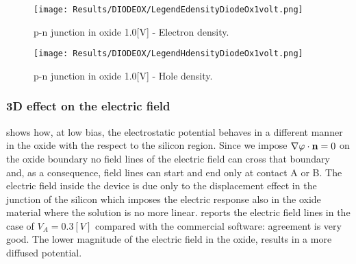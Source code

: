 \vspace{0.5cm}

\begin{figure}[!h]
\centering
{}
\hspace{0.1\textwidth}
\hspace{0.04\textwidth}
{\texttt{[image: Results/DIODEOX/LegendEdensityDiodeOx1volt.png]}}
\caption{p-n junction in oxide 1.0[V] - Electron density.}
\label{fig: edensity diodeox 1V}
\end{figure}

\vspace{0.5cm}

\begin{figure}[!h]
\centering
{}
\hspace{0.1\textwidth}
\hspace{0.04\textwidth}
{\texttt{[image: Results/DIODEOX/LegendHdensityDiodeOx1volt.png]}}
\caption{p-n junction in oxide 1.0[V] - Hole density.}
\label{fig: hdensity diodeox 1V}
\end{figure}

\clearpage





\subsubsection{3D effect on the electric field}


 shows how, at low bias, the electrostatic potential behaves in a different manner in the oxide with the respect to the silicon region.
Since we impose $\nabla \varphi \cdot \mathbf{n}=0$ on the oxide boundary no field lines of the electric field can cross that boundary and, as a consequence, field lines can start and end only at contact A or B.
The electric field inside the device is due only to the displacement effect in the junction of the silicon which imposes the electric response also in the oxide material where the solution is no more linear.  reports the electric field lines in the case of $V_A=0.3[V]$ compared with the commercial software: agreement is very good. The lower magnitude of the electric field in the oxide, results in a more diffused potential.

